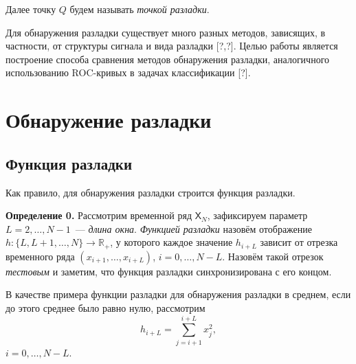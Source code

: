 \documentclass{math-mech-sci}
\newcommand{\X}{\mathsf X}
\begin{document}
Далее точку $Q$ будем называть \textit{точкой разладки}.

Для обнаружения разладки существует много разных методов, зависящих, в частности, от структуры сигнала и вида разладки [?,?]. Целью работы является построение способа сравнения методов обнаружения разладки, аналогичного использованию ROC-кривых в задачах классификации [?].

\section{Обнаружение разладки}
\subsection{Функция разладки}
Как правило, для обнаружения разладки строится функция разладки. %

\textbf{Определение 0.} Рассмотрим временной ряд $\X_N$, зафиксируем параметр $L=2,\ldots,N-1$~--- \textit{длина окна}. \textit{Функцией разладки} назовём отображение $h:\{L,L+1,\ldots,N\}\to\mathbb{R}_+$, у которого каждое значение $h_{i+L}$ зависит от отрезка временного ряда $(x_{i+1},\ldots,x_{i+L})$, $i=0,\ldots,N-L$. Назовём такой отрезок \textit{тестовым} и заметим, что функция разладки синхронизирована с его концом.

В качестве примера функции разладки для обнаружения разладки в среднем, если до этого среднее было равно нулю, рассмотрим
\begin{equation}\label{eq:h}
	h_{i+L}=\sum\limits_{j=i+1}^{i+L}x_j^2,
\end{equation}
$i=0,\ldots,N-L$.

\end{document}

